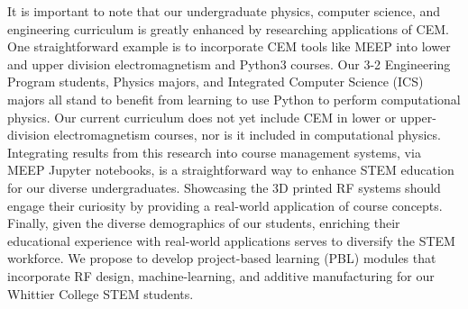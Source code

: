 \documentclass[../../main.tex]{subfiles}
\begin{document}
It is important to note that our undergraduate physics, computer science, and engineering curriculum is greatly enhanced by researching applications of CEM.  One straightforward example is to incorporate CEM tools like MEEP into lower and upper division electromagnetism and Python3 courses.  Our 3-2 Engineering Program students, Physics majors, and Integrated Computer Science (ICS) majors all stand to benefit from learning to use Python to perform computational physics.  Our current curriculum does not yet include CEM in lower or upper-division electromagnetism courses, nor is it included in computational physics.  Integrating results from this research into course management systems, via MEEP Jupyter notebooks, is a straightforward way to enhance STEM education for our diverse undergraduates.  Showcasing the 3D printed RF systems should engage their curiosity by providing a real-world application of course concepts.  Finally, given the diverse demographics of our students, enriching their educational experience with real-world applications serves to diversify the STEM workforce.  We propose to develop project-based learning (PBL) modules that incorporate RF design, machine-learning, and additive manufacturing for our Whittier College STEM students.  \\ \vspace{2.5mm}
\end{document}
